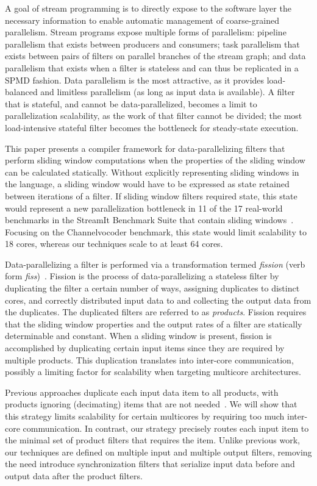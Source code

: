 A goal of stream programming is to directly expose to the software
layer the necessary information to enable automatic management of
coarse-grained parallelism.  Stream programs expose multiple forms of
parallelism: pipeline parallelism that exists between producers and
consumers; task parallelism that exists between pairs of filters on
parallel branches of the stream graph; and data parallelism that
exists when a filter is stateless and can thus be replicated in a SPMD
fashion.  Data parallelism is the most attractive, as it provides
load-balanced and limitless parallelism (as long as input data is
available).  A filter that is stateful, and cannot be
data-parallelized, becomes a limit to parallelization scalability, as
the work of that filter cannot be divided; the most load-intensive
stateful filter becomes the bottleneck for steady-state execution.

This paper presents a compiler framework for data-parallelizing
filters that perform sliding window computations when the properties
of the sliding window can be calculated statically.   Without explicitly
representing sliding windows in the language, a sliding window would
have to be expressed as state retained between iterations of a
filter.  If sliding window filters required state, this state would
represent a new parallelization bottleneck in 11 of the
17 real-world benchmarks in the StreamIt Benchmark Suite 
that contain sliding windows~\cite{streamit-suite}.  Focusing
on the Channelvocoder benchmark, this state would limit scalability to
18 cores, whereas our techniques scale to at least 64 cores.

Data-parallelizing a filter is performed via a transformation termed
{\it fission} (verb form {\it fiss})~\cite{streamit-asplos}.  Fission
is the process of data-parallelizing a stateless filter by duplicating
the filter a certain number of ways, assigning duplicates to distinct
cores, and correctly distributed input data to and collecting the
output data from the duplicates.  The duplicated filters are referred
to as {\it products}.  Fission requires that the sliding window
properties and the output rates of a filter are statically
determinable and constant.  When a sliding window is present, fission
is accomplished by duplicating certain input items since they are
required by multiple products.  This duplication translates into
inter-core communication, possibly a limiting factor for scalability when
targeting multicore architectures.

Previous approaches duplicate each input data item to all products,
with products ignoring (decimating) items that are not
needed~\cite{streamit-asplos}.  We will show that this strategy limits
scalability for certain multicores by requiring too much inter-core
communication.  In contrast, our strategy precisely routes each input
item to the minimal set of product filters that requires the item.
Unlike previous work, our techniques are defined on
multiple input and multiple output filters, removing the need
introduce synchronization filters that serialize input data before and
output data after the product filters.  

